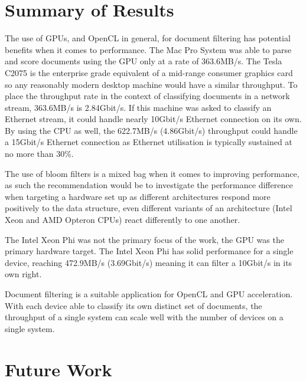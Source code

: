 \section{Summary of Results}

The use of GPUs, and OpenCL in general, for document filtering has potential
benefits when it comes to performance. The Mac Pro System was able to parse and
score documents using the GPU only at a rate of 363.6MB/s. The Tesla C2075 is
the enterprise grade equivalent of a mid-range consumer graphics card so any
reasonably modern desktop machine would have a similar throughput. To place the
throughput rate in the context of classifying documents in a network stream,
363.6MB/s is 2.84Gbit/s. If this machine was asked to classify an Ethernet
stream, it could handle nearly 10Gbit/s Ethernet connection on its own. By using
the CPU as well, the 622.7MB/s (4.86Gbit/s) throughput could handle a 15Gbit/s
Ethernet connection as Ethernet utilisation is typically sustained at no more
than 30\%.

The use of bloom filters is a mixed bag when it comes to improving performance,
as such the recommendation would be to investigate the performance difference
when targeting a hardware set up as different architectures respond more
positively to the data structure, even different variants of an architecture
(Intel Xeon and AMD Opteron CPUs) react differently to one another.

The Intel Xeon Phi was not the primary focus of the work, the GPU was the
primary hardware target. The Intel Xeon Phi has solid performance for a single
device, reaching 472.9MB/s (3.69Gbit/s) meaning it can filter a 10Gbit/s in its
own right.

Document filtering is a suitable application for OpenCL and GPU acceleration.
With each device able to classify its own distinct set of documents, the
throughput of a single system can scale well with the number of devices on a
single system.

\section{Future Work}

